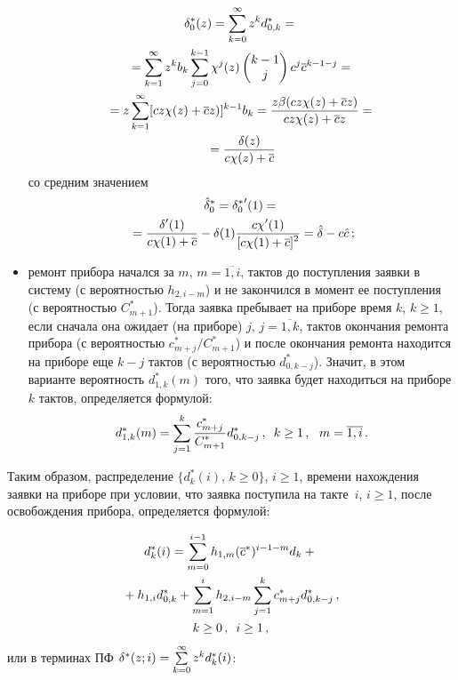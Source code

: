 \begin{multicols}{2}
\begin{itemize}
\noindent
\begin{multline*}
\label{delta1*}
\delta^*_0(z) = \sum_{k=0}^{\infty} z^k d^*_{0,k} = {}\\
{}=\sum_{k=1}^{\infty} z^k b_k \sum_{j=0}^{k-1}
\chi^j(z) \begin{pmatrix}k-1\\ j\end{pmatrix} c^j \overline c^{k-1-j}
={}\\
{}=
z \sum_{k=1}^{\infty} [c z \chi(z) + \overline c z)]^{k-1} b_k
= \displaystyle\frac{\displaystyle z \beta (c z \chi(z) + \overline c z)\mathstrut}{\displaystyle c z \chi(z) + \overline c z\mathstrut}
={}\\
{}=
\displaystyle\frac{\displaystyle \delta(z) \mathstrut}{\displaystyle c \chi(z) + \overline c\mathstrut}
\end{multline*}
со средним значением
\begin{multline*}
\hat\delta^*_0 = {\delta^*_0}'(1) = {}\\
{}=\displaystyle\frac{\displaystyle \delta'(1) \mathstrut}{\displaystyle c \chi(1) + \overline c\mathstrut} -
\delta(1)\displaystyle\frac{\displaystyle c \chi'(1)\mathstrut}{\displaystyle [c \chi(1) + \overline c]^2\mathstrut}
= \hat \delta - c\hat c\,;
\end{multline*}
\item
ремонт прибора начался за $m$, $m=\overline{1,i}$,
тактов до поступления заявки в систему (с вероятностью
$h_{2,i-m}$) и не закончился в момент ее поступления
(с вероятностью $C^*_{m+1}$).
Тогда заявка пребывает на приборе время $k$, $k\ge 1$,
если сначала она ожидает (на приборе) $j$, $j=\overline{1,k}$,
тактов окончания ремонта прибора (с вероятностью
$c^*_{m+j}/C^*_{m+1}$) и после окончания ремонта находится
на приборе еще $k-j$ тактов (с вероятностью $d^*_{0,k-j}$).
Значит, в этом варианте вероятность $d^*_{1,k}(m)$ того,
что заявка будет находиться на приборе $k$ тактов,
определяется формулой:
$$
d^*_{1,k}(m) = \sum_{j=1}^{k} \displaystyle\frac{\displaystyle c^*_{m+j}\mathstrut}{\displaystyle C^*_{m+1}\mathstrut} d^*_{0,k-j}\,,
\enskip k\ge 1\,,
\ \ m=\overline{1,i}\,.
$$
\end{itemize}

Таким образом, распределение $\{d^*_{k}(i)$, $k\ge 0\}$,
$i\ge 1$, времени нахождения заявки на приборе при условии,
что заявка поступила на такте~$i$, $i\ge 1$, после
освобождения прибора, определяется формулой:

\noindent
\begin{multline*}
d^*_{k}(i)= \sum_{m=0}^{i-1} h_{1,m} (\overline c^*)^{i-1-m} d_k +{}\\
{}+
h_{1,i} d^*_{0,k}+ \sum_{m=1}^{i} h_{2,i-m} \sum_{j=1}^{k} c^*_{m+j} d^*_{0,k-j}\,,\\
k\ge 0\,, \enskip  i\ge 1\,,
\end{multline*}
или в терминах ПФ
$\d^*(z;i)\hm=\sum\limits_{k=0}^{\infty} z^k d^*_{k}(i)$:
\pagebreak


\end{multicols}
